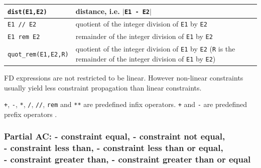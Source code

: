 \begin{tabular}{|l|L{10cm}|}
\texttt{dist(E1,E2)} & distance, i.e. $|$\texttt{E1 - E2$|$} \\

\hline

\texttt{E1 // E2} & quotient of the integer division of \texttt{E1} by
\texttt{E2} \\

\hline

\texttt{E1 rem E2} & remainder of the integer division of \texttt{E1} by
\texttt{E2} \\

\hline

\texttt{quot\_rem(E1,E2,R)} & quotient of the integer division of
                              \texttt{E1} by \texttt{E2}
                              \newline
                              (\texttt{R} is the remainder of the integer division
                              of \texttt{E1} by \texttt{E2}) \\

\hline
\end{tabular}

FD expressions are not restricted to be linear. However non-linear
constraints usually yield less constraint propagation than linear
constraints.

\texttt{+}, \texttt{-}, \texttt{*}, \texttt{/}, \texttt{//}, \texttt{rem}
and \texttt{**} are predefined infix operators. \texttt{+} and \texttt{-}
are predefined prefix operators .

\begin{PlErrors}




\end{PlErrors}

\subsubsection{Partial AC:  - constraint equal, \label{Partial-AC:-(:=)/2}
                - constraint not equal, \\
                - constraint less than,
                - constraint less than or equal, \\
                - constraint greater than,
                - constraint greater than or equal}

